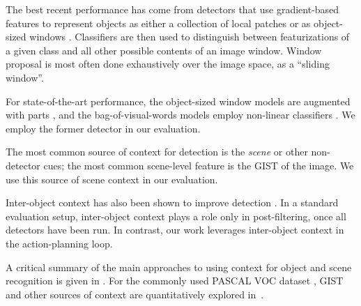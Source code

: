 The best recent performance has come from detectors that use gradient-based features to represent objects as either a collection of local patches or as object-sized windows \cite{Dalal2005,Lowe2004}.
Classifiers are then used to distinguish between featurizations of a given class and all other possible contents of an image window.
Window proposal is most often done exhaustively over the image space, as a ``sliding window''.

For state-of-the-art performance, the object-sized window models are augmented with parts \cite{Felzenszwalb2010a}, and the bag-of-visual-words models employ non-linear classifiers \cite{Vedaldi2009}.
We employ the former detector in our evaluation.




The most common source of context for detection is the \emph{scene} or other non-detector cues; the most common scene-level feature is the GIST \cite{Oliva2001a} of the image.
We use this source of scene context in our evaluation.

Inter-object context has also been shown to improve detection \cite{Torralba2004}.
In a standard evaluation setup, inter-object context plays a role only in post-filtering, once all detectors have been run.
In contrast, our work leverages inter-object context in the action-planning loop.

A critical summary of the main approaches to using context for object and scene recognition is given in \cite{Galleguillos2010}.
For the commonly used PASCAL VOC dataset \cite{pascal-voc-2010}, GIST and other sources of context are quantitatively explored in~\cite{Divvala2009}.

